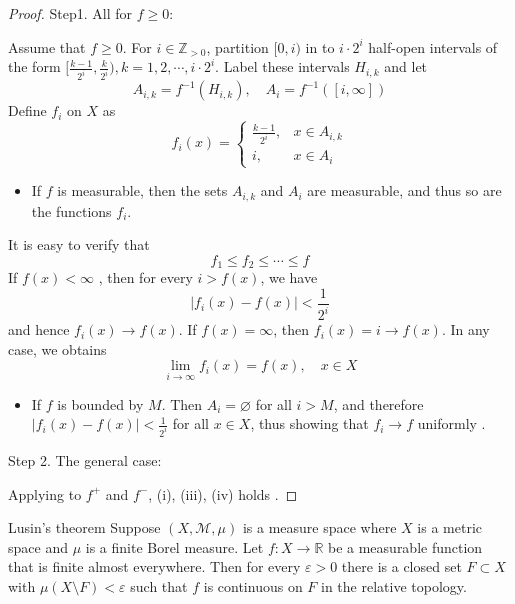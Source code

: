 \documentclass[../main.tex]{subfiles}
\begin{document}
\begin{proof}

    Step1. All for \(  f\ge 0  \):
    
    
    Assume that \(  f\ge 0  \). For \(  i \in \mathbb{Z} _{> 0}  \), partition \(  [0,i)  \)    in to \(  i\cdot 2^{i}  \) half-open intervals of the form \(  [\frac{k-1 }{2^{i} },\frac{k }{2^{i} }  ),k = 1,2,\cdots ,i\cdot 2^{i}  \). Label these intervals \(  H_{i,k}  \) and let \[
    A_{i,k}= f^{-1} \left( H_{i,k} \right),\quad A_{i}= f^{-1} \left( \left[ i,\infty \right]  \right)  
    \]   Define \(  f_{i}  \) on \(  X  \) as \[
    f_{i}\left( x \right)= \begin{cases} \frac{k-1 }{2^{i} },&x\in A_{i,k}\\ 
     i,&x\in A_{i}  \end{cases}  
    \]
    \begin{itemize}
        \item If \(  f  \) is measurable, then the sets \(  A_{i,k}  \) and \(  A_{i}  \) are measurable, and thus so are the functions \(  f_{i}  \). 
    \end{itemize}
     
    It is easy to verify that  \[
    f_1\le f_2\le \cdots \le f
    \]      If \(  f\left( x \right)< \infty   \) , then for every \(  i> f\left( x \right)   \), we have \[
    \left| f_{i}\left( x \right)-f\left( x \right)   \right|< \frac{1 }{2^{i} }  
    \]  and hence \(  f_{i}\left( x \right)\to f\left( x \right)    \). If \(  f\left( x \right)= \infty   \), then \(  f_{i}\left( x \right)= i\to f\left( x \right)    \). In any case, we obtains \[
    \lim_{i\to \infty}f_{i}\left( x \right)= f\left( x \right),\quad x\in X  
    \]   \begin{itemize}
        \item If \(  f   \) is bounded by \(  M  \). Then \(  A_{i}= \varnothing  \)   for all \(  i> M  \), and therefore \(  \left| f_{i}\left( x \right)-f\left( x \right)   \right|< \frac{1 }{2^{i} }    \) for all \(  x \in X  \), thus showing that \(  f_{i}\to f  \) uniformly .    
    \end{itemize}

    Step 2. The general case:

   Applying to \(  f^{+ }  \) and \(  f^{-}  \), (i), (iii), (iv)  holds . 
    
\end{proof}
\begin{theorem}{Lusin's theorem}{}
Suppose $(X, \mathcal{M}, \mu)$ is a measure space where $X$ is a metric space and $\mu$ is a finite Borel measure. Let $f: X \to \mathbb{R}$ be a measurable function that is finite almost everywhere. Then for every $\varepsilon > 0$ there is a closed set $F \subset X$ with $\mu(X\setminus F) < \varepsilon$ such that $f$ is continuous on $F$ in the relative topology.
\end{theorem}
\end{document}
